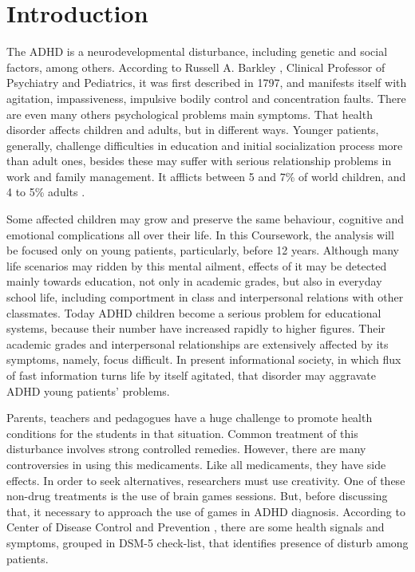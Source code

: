 \chapter{Introduction}
\label{ch:introduction}

The ADHD is a neurodevelopmental disturbance, including genetic and social factors, among others. According to Russell A. Barkley \citep{ADHDDay}, Clinical Professor of Psychiatry and Pediatrics, it was first described in 1797, and manifests itself with agitation, impassiveness, impulsive bodily control and concentration faults. There are even many others psychological problems main symptoms. That health disorder affects children and adults, but in different ways. Younger patients, generally, challenge difficulties in education and initial socialization process more than adult ones, besides these may suffer with serious relationship problems in work and family management. It afflicts between 5 and 7\% of world children, and 4 to 5\% adults \citep{ADHDDay}.

Some affected children may grow and preserve the same behaviour, cognitive and emotional complications all over their life. In this Coursework, the analysis will be focused only on young patients, particularly, before 12 years. Although many life scenarios may ridden by this mental ailment, effects of it may be detected mainly towards education, not only in academic grades, but also in everyday school life, including comportment in class and interpersonal relations with other classmates. Today ADHD children become a serious problem for educational systems, because their number have increased rapidly to higher figures. Their academic grades and interpersonal relationships are extensively affected by its symptoms, namely, focus difficult. In present informational society, in which flux of fast information turns life by itself agitated, that disorder may aggravate ADHD young patients' problems.  

Parents, teachers and pedagogues have a huge challenge to promote health conditions for the students in that situation. Common treatment of this disturbance involves strong controlled remedies. However, there are many controversies in using this medicaments. Like all medicaments, they have side effects. In order to seek alternatives, researchers must use creativity.  One of these non-drug treatments is the use of brain games sessions.  But, before discussing that, it necessary to approach the use of games in ADHD diagnosis. According to Center of Disease Control and Prevention \citep{DSM-5}, there are some health signals and symptoms, grouped in DSM-5 check-list, that identifies presence of disturb among patients. 

